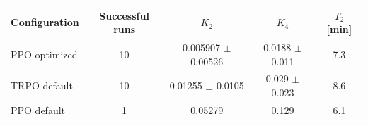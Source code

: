 \begin{tabular}{lcccc}
\toprule
Configuration & Successful runs & $K_2$ & $K_4$ & $T_2$ [min] \\
\midrule
PPO optimized & 10 & 0.005907 $\pm$ 0.00526 & 0.0188 $\pm$ 0.011 & 7.3 \\
TRPO default & 10 & 0.01255 $\pm$ 0.0105 & 0.029 $\pm$ 0.023 & 8.6 \\
PPO default & 1 & 0.05279 & 0.129 & 6.1 \\
\bottomrule
\end{tabular}
